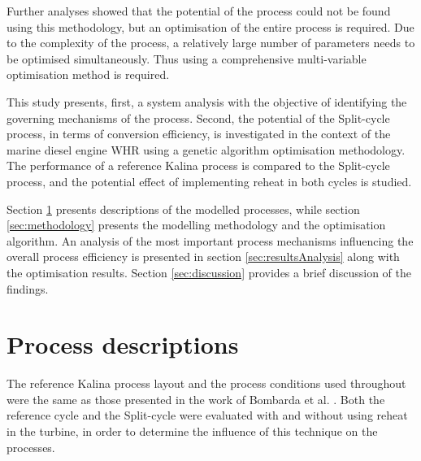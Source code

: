 \documentclass[review,3p]{elsarticle}
\begin{document}
Further analyses showed that the potential of the process could not be found using this methodology, but an optimisation of the entire process is required. Due to the complexity of the process, a relatively large number of parameters needs to be optimised simultaneously. Thus using a comprehensive multi-variable optimisation method is required.

This study presents, first, a system analysis with the objective of identifying the governing mechanisms of the process. Second, the potential of the Split-cycle process, in terms of conversion efficiency, is investigated in the context of the marine diesel engine WHR using a genetic algorithm optimisation methodology. The performance of a reference Kalina process is compared to the Split-cycle process, and the potential effect of implementing reheat in both cycles is studied.

Section \ref{sec:processDescriptions} presents descriptions of the modelled processes, while section \ref{sec:methodology} presents the modelling methodology and the optimisation algorithm. An analysis of the most important process mechanisms influencing the overall process efficiency is presented in section \ref{sec:resultsAnalysis} along with the optimisation results. Section \ref{sec:discussion} provides a brief discussion of the findings.










\section{Process descriptions}
\label{sec:processDescriptions}
The reference Kalina process layout and the process conditions used throughout were the same as those presented in the work of Bombarda et al. \cite{Bombarda2010b}. Both the reference cycle and the Split-cycle were evaluated with and without using reheat in the turbine, in order to determine the influence of this technique on the processes. 
\end{document}

